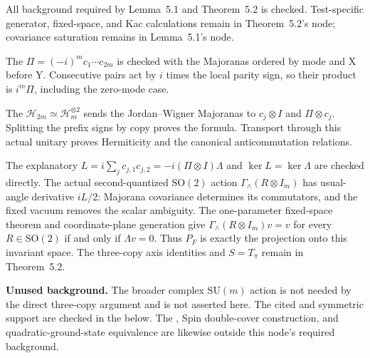 \begin{lemma}
  All background required by Lemma~5.1 and Theorem~5.2 is checked.
  Test-specific generator, fixed-space, and Kac calculations remain in
  Theorem~5.2's node; covariance saturation remains in Lemma~5.1's node.

  The 
$\Pi=(-i)^m c_1\cdots c_{2m}$ is checked with the Majoranas ordered by
mode and X before Y. Consecutive pairs act by $i$ times the local parity
sign, so their product is $i^m\Pi$, including the zero-mode case.

  The 
$\mathcal H_{2m}\simeq\mathcal H_m^{\otimes2}$ sends the Jordan--Wigner
Majoranas to $c_j\otimes I$ and $\Pi\otimes c_j$. Splitting the prefix signs
by copy proves the formula. Transport through this actual unitary proves
Hermiticity and the canonical anticommutation relations.

  The explanatory 
$L=i\sum_j c_{j,1}c_{j,2}=-i(\Pi\otimes I)\Lambda$ and
$\ker L=\ker\Lambda$ are checked directly. The actual second-quantized
$\mathrm{SO}(2)$ action $\Gamma_\wedge(R\otimes I_m)$ has usual-angle
derivative $iL/2$: Majorana covariance determines its commutators, and the
fixed vacuum removes the scalar ambiguity. The one-parameter fixed-space
theorem and coordinate-plane generation give
$\Gamma_\wedge(R\otimes I_m)v=v$ for every $R\in\mathrm{SO}(2)$ if and only
if $\Lambda v=0$. Thus $P_F$ is exactly the projection onto this invariant
space. The three-copy axis identities and $S=T_\pi$ remain in Theorem~5.2.

  \textbf{Unused background.} The broader complex $\mathrm{SU}(m)$ action
  is not needed by the direct three-copy argument and is not asserted here.
  The cited 
  and symmetric support are checked in the
   below.
  The , Spin double-cover
  construction, and quadratic-ground-state equivalence are likewise outside
  this node's required background.
\end{lemma}

